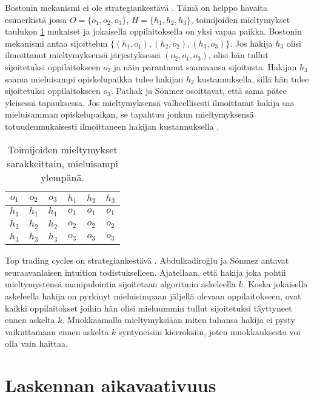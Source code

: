 \documentclass[twoside]{tktltiki}
\begin{document}
Bostonin mekanismi ei ole strategiankestävä \cite{abduson03}. Tämä on
helppo havaita esimerkistä jossa $O = \{o_1, o_2, o_3\}$, $H = \{h_1,
h_2, h_3\}$, toimijoiden mieltymykset taulukon \ref{boston_strategia}
mukaiset ja jokaisella oppilaitoksella on yksi vapaa paikka. Bostonin
mekanismi antaa sijoittelun $\{(h_1, o_1), (h_2, o_2), (h_3, o_3)\}$.
Jos hakija $h_3$ olisi ilmoittanut mieltymyksensä järjestyksessä
$(o_2, o_1, o_3)$, olisi hän tullut sijoitetuksi oppilaitokseen $o_2$
ja näin parantanut saamaansa sijoitusta. Hakijan $h_3$ saama
mieluisampi opiskelupaikka tulee hakijan $h_2$ kustannuksella, sillä
hän tulee sijoitetuksi oppilaitokseen $o_3$. Pathak ja Sönmez
osoittavat, että sama pätee yleisessä tapauksessa. Jos mieltymyksensä
valheellisesti ilmoittanut hakija saa mieluisamman opiskelupaikan, se
tapahtuu jonkun mieltymyksensä totuudenmukaisesti ilmoittaneen hakijan
kustannuksella \cite{pathak08}.

\begin{table}[]
  \begin{center}
    \begin{tabular}{ c c c | c c c }
      $o_1$ & $o_2$ & $o_3$ & $h_1$ & $h_2$ & $h_3$ \\
      \hline
      $h_1$ & $h_1$ & $h_1$ & $o_1$ & $o_1$ & $o_1$ \\
      $h_2$ & $h_2$ & $h_2$ & $o_2$ & $o_2$ & $o_2$ \\
      $h_3$ & $h_3$ & $h_3$ & $o_3$ & $o_3$ & $o_3$
    \end{tabular}
    \caption{Toimijoiden mieltymykset sarakkeittain, mieluisampi ylempänä.}
    \label{boston_strategia}
  \end{center}
\end{table}

Top trading cycles on strategiankestävä \cite{abduson03}.
Abdulkadiroğlu ja Sönmez antavat seuraavanlaisen intuition
todistukselleen. Ajatellaan, että hakija joka pohtii mieltymystensä
manipulointia sijoitetaan algoritmin askeleella $k$. Koska jokaisella
askeleella hakija on pyrkinyt mieluisimpaan jäljellä olevaan
oppilaitokseen, ovat kaikki oppilaitokset joihin hän olisi mieluummin
tullut sijoitetuksi täyttyneet ennen askelta $k$. Muokkaamalla
mieltymyksiään miten tahansa hakija ei pysty vaikuttamaan ennen
askelta $k$ syntyneisiin kierroksiin, joten muokkauksesta voi olla
vain haittaa.

\section{Laskennan aikavaativuus}
\label{aikavaativuus_luku}
\end{document}
